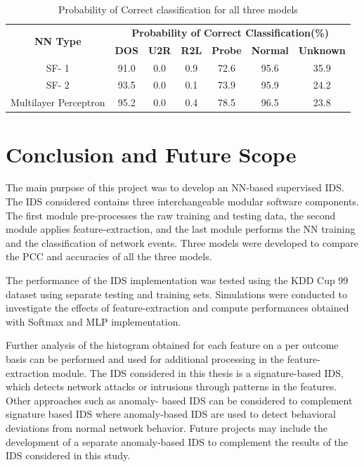 \documentclass[12pt]{article}
\theoremstyle{definition}
\begin{document}
		\begin{table}[!h]
			\centering
			\caption{Probability of Correct classification for all three models }
			\label{tab:pcc-results}
			\begin{tabular}{|c|c|c|c|c|c|c|}
				\hline
				\multirow{2}{*}{\textbf{NN Type}} & \multicolumn{6}{c|}{\textbf{Probability of Correct Classification(\%)}}                          \\ \cline{2-7} 
				& \textbf{DOS} & \textbf{U2R} & \textbf{R2L} & \textbf{Probe} & \textbf{Normal} & \textbf{Unknown} \\ \hline
				SF- 1                             & 91.0         & 0.0          & 0.9          & 72.6           & 95.6            & 35.9        \\     
				SF- 2                              & 93.5         & 0.0          & 0.1          & 73.9           & 95.9            & 24.2      \\       
				Multilayer Perceptron             & 95.2         & 0.0          & 0.4          & 78.5           & 96.5            & 23.8    \\    \hline     
			\end{tabular}
		\end{table}
		

	\cleardoublepage
	\section{Conclusion and Future Scope}
	The main purpose of this project was to develop an NN-based supervised IDS. The IDS considered contains three interchangeable modular software components. The first
	module pre-processes the raw training and testing data, the second module applies feature-extraction, and the last module performs the NN training and the classification of
	network events. Three models were developed to compare the PCC and accuracies of all the three models.
	
	The performance of the IDS implementation was tested using the KDD Cup 99 dataset using separate testing and training sets. Simulations were conducted to investigate the effects of feature-extraction and compute performances obtained with Softmax and MLP implementation.
	
	Further analysis of the histogram obtained for each feature on a per outcome basis can be performed and used for additional processing in the feature-extraction module.
	The IDS considered in this thesis is a signature-based IDS, which detects network attacks or intrusions through patterns in the features. Other approaches such as anomaly-
	based IDS can be considered to complement signature based IDS where anomaly-based IDS are used to detect behavioral deviations from normal network behavior. Future projects may include the development of a separate anomaly-based IDS
	to complement the results of the IDS considered in this study.
	
\end{document}
